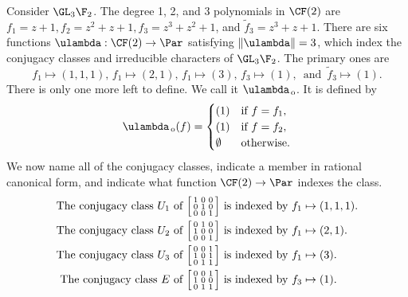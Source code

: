 \begin{example}
\label{conj_class_example}
Consider $\GL_3 \F_2$.
The degree 1, 2, and 3 polynomials in $\CF (2)$ are
$f_1 = z+1, f_2 = z^2+z+1, f_3 = z^3+z^2+1$, and $\tilde{f}_3 = z^3+z+1$.
There are six functions $\ulambda : \CF (2) \to \Par$ satisfying $\| \ulambda \| = 3$, which index the conjugacy classes and irreducible characters of $\GL_3 \F_2$. The primary ones are
$$
f_1 \mapsto (1,1,1), \,
f_1 \mapsto (2,1), \,
f_1 \mapsto (3), \,
f_3 \mapsto (1), \,
\text{ and } \,
\tilde{f}_3 \mapsto (1).
$$
There is only one more left to define. We call it $\ulambda_{\,\mathrm{o}}$. It is defined by
$$ \ulambda_{\,\mathrm{o}} (f) =
\begin{cases}
(1) & \text{if } f = f_1, \\
(1) & \text{if } f = f_2, \\
\emptyset & \text{otherwise.}
\end{cases}
$$
We now name all of the conjugacy classes, indicate a member in rational canonical form, and indicate what function $\CF (2) \to \Par$ indexes the class.
\begin{align*}
\text{The conjugacy class } U_{1} \text{ of }
\begin{bsmallmatrix}
1 & 0 & 0 \\
0 & 1 & 0 \\
0 & 0 & 1
\end{bsmallmatrix}
&
\text{ is indexed by }
f_1 \mapsto (1,1,1). \\
\text{The conjugacy class } U_{2} \text{ of }
\begin{bsmallmatrix}
0 & 1 & 0 \\
1 & 0 & 0 \\
0 & 0 & 1
\end{bsmallmatrix}
&
\text{ is indexed by }
f_1 \mapsto (2,1). \\
\text{The conjugacy class } U_{3} \text{ of }
\begin{bsmallmatrix}
0 & 0 & 1 \\
1 & 0 & 1 \\
0 & 1 & 1
\end{bsmallmatrix}
&
\text{ is indexed by }
f_1 \mapsto (3). \\
\text{The conjugacy class } E \text{ of }
\begin{bsmallmatrix}
0 & 0 & 1 \\
1 & 0 & 0 \\
0 & 1 & 1
\end{bsmallmatrix}
&
\text{ is indexed by }
f_3 \mapsto (1). \\

\end{align*}
\end{example}
